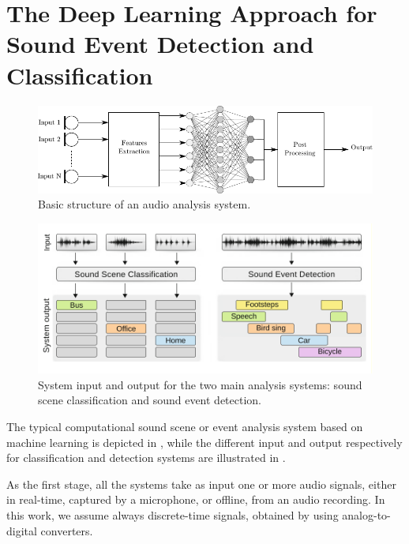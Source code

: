 \section{The Deep Learning Approach for Sound Event Detection and Classification}

\begin{figure}[b]
	\centering
	\includegraphics[width=\linewidth]{img/flowchart_1.pdf}
	\caption[Basic structure]{Basic structure of an audio analysis system.}
	\label{fig:base-system}
\end{figure}

\begin{figure}[tb]
	\centering
	\includegraphics[width=\linewidth]{img/sed_sec.pdf}
	\caption[System input and output ]{System input and output for the two main analysis systems: sound scene classification and sound event detection.}
	\label{fig:system-io}
\end{figure}

The typical computational sound scene
or event analysis system based on machine learning is
depicted in , while the different input and output respectively for classification and detection systems
are illustrated in .

As the first stage, all the systems take as input one or more audio
signals, either in real-time, captured by a microphone, or offline, from an
audio recording. In this work, we assume always discrete-time signals,
obtained by using analog-to-digital converters. 

